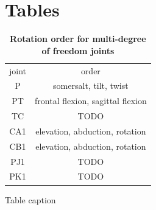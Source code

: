 \documentclass[10pt]{article}
\begin{document}
\section*{Tables}

\begin{table}[!ht]
\caption{
\bf{Rotation order for multi-degree of freedom joints}}
\begin{tabular}{|c|c|}
    joint & order \\
    P & somersalt, tilt, twist \\
    PT & frontal flexion, sagittal flexion \\
    TC & TODO \\
    CA1 & elevation, abduction, rotation \\
    CB1 & elevation, abduction, rotation \\
    PJ1 & TODO \\
    PK1 & TODO \\

\end{tabular}
\begin{flushleft}Table caption
\end{flushleft}
\label{tab:dof}
 \end{table}
\end{document}
